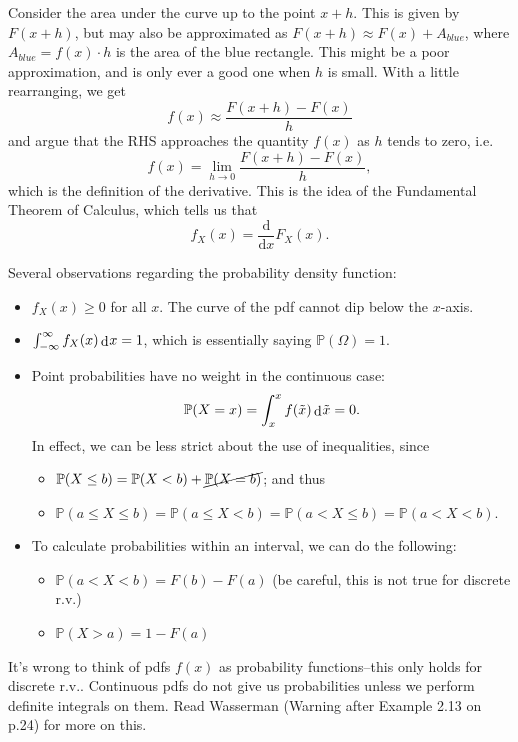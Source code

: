 \documentclass[
]{book}
\providecommand{\tightlist}{%
  \setlength{\itemsep}{0pt}\setlength{\parskip}{0pt}}
\newcommand{\bbP}{\mathbb{P}}
\DeclareMathOperator{\dd}{d}
\newcommand{\dint}{\dd\hspace{0.5pt}\!}
\newcommand{\ddif}{\text{d}}
\theoremstyle{definition}
\theoremstyle{definition}
\theoremstyle{definition}
\theoremstyle{definition}
\theoremstyle{remark}
\begin{document}
Consider the area under the curve up to the point \(x+h\).
This is given by \(F(x+h)\), but may also be approximated as \(F(x+h) \approx F(x) + A_{blue}\), where \(A_{blue}=f(x)\cdot h\) is the area of the blue rectangle.
This might be a poor approximation, and is only ever a good one when \(h\) is small.
With a little rearranging, we get
\[
f(x) \approx \frac{F(x+h)-F(x)}{h}
\]
and argue that the RHS approaches the quantity \(f(x)\) as \(h\) tends to zero, i.e.
\[
f(x) = \lim_{h\to 0} \frac{F(x+h)-F(x)}{h},
\]
which is the definition of the derivative.
This is the idea of the Fundamental Theorem of Calculus, which tells us that
\[
  f_X(x) = \frac{\ddif}{\ddif x}F_X(x).
\]

Several observations regarding the probability density function:

\begin{itemize}
\tightlist
\item
  \(f_X(x) \geq 0\) for all \(x\). The curve of the pdf cannot dip below the \(x\)-axis.
\item
  \(\int_{-\infty}^\infty f_X(x) \dint x = 1\), which is essentially saying \(\bbP(\Omega)=1\).
\item
  Point probabilities have no weight in the continuous case: \[\bbP(X=x) = \int_x^x f(\tilde x) \dint \tilde x = 0.\] In effect, we can be less strict about the use of inequalities, since

  \begin{itemize}
  \tightlist
  \item
    \(\bbP(X \leq b) = \bbP(X <b) + \cancel{\bbP(X=b)}\); and thus
  \item
    \(\bbP(a \leq X \leq b) = \bbP(a \leq X < b) = \bbP(a < X \leq b) = \bbP(a < X < b)\).
  \end{itemize}
\item
  To calculate probabilities within an interval, we can do the following:

  \begin{itemize}
  \tightlist
  \item
    \(\bbP(a<X<b) = F(b) - F(a)\) (be careful, this is not true for discrete r.v.)
  \item
    \(\bbP(X > a) = 1 - F(a)\)
  \end{itemize}
\end{itemize}

It's wrong to think of pdfs \(f(x)\) as probability functions--this only holds for discrete r.v..
Continuous pdfs do not give us probabilities unless we perform definite integrals on them.
Read Wasserman (Warning after Example 2.13 on p.24) for more on this.
\end{document}
